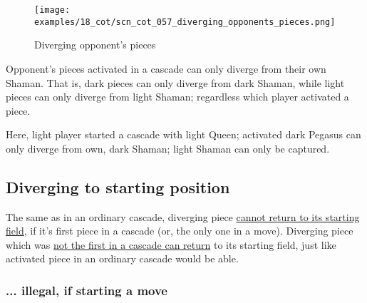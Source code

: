 \vspace*{-1.4\baselineskip}
\noindent
\begin{figure}[!h]
\texttt{[image: examples/18\_cot/scn\_cot\_057\_diverging\_opponents\_pieces.png]}
\vspace*{-1.3\baselineskip}
\caption{Diverging opponent's pieces}
\label{fig:scn_cot_057_diverging_opponents_pieces}
\end{figure}

\vspace*{-0.5\baselineskip}
Opponent's pieces activated in a cascade can only diverge from their own Shaman.
That is, dark pieces can only diverge from dark Shaman, while light pieces can only
diverge from light Shaman; regardless which player activated a piece.

Here, light player started a cascade with light Queen; activated dark Pegasus
can only diverge from own, dark Shaman; light Shaman can only be captured.

\clearpage %

\subsection*{Diverging to starting position}
\label{sec:Conquest of Tlalocan/Divergence/Diverging to starting position}

\vspace*{-0.7\baselineskip}
The same as in an ordinary cascade, diverging piece
\hyperref[fig:scn_mv_47_static_move_is_illegal_init]{cannot return to its starting field},
if it's first piece in a cascade (or, the only one in a move). Diverging piece which was
\hyperref[fig:scn_mv_49_static_piece_is_legal_init]{not the first in a cascade can return}
to its starting field, just like activated piece in an ordinary cascade would be able.

\vspace*{-0.7\baselineskip}
\subsubsection*{... illegal, if starting a move}
\label{sec:Conquest of Tlalocan/Divergence/Diverging to starting position/... illegal, if starting a move}

